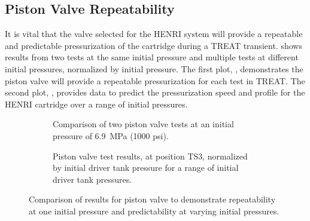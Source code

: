 \subsection{Piston Valve Repeatability} \label{ss:repeatability}
It is vital that the valve selected for the HENRI system will provide a repeatable and predictable pressurization of the cartridge during a TREAT transient.  shows results from two tests at the same initial pressure and multiple tests at different initial pressures, normalized by initial pressure. The first plot, , demonstrates the piston valve will provide a repeatable pressurization for each test in TREAT. The second plot, , provides data to predict the pressurization speed and profile for the HENRI cartridge over a range of initial pressures.


\begin{figure}[htbp]
    \centering
    \begin{subfigure}[t]{0.45\textwidth}
        \centering
        \caption{Comparison of two piston valve tests at an initial pressure of \SI{6.9}{\mega\pascal} (1000 psi).}
        \label{fig:piston 2 test}
    \end{subfigure}
    \hfill
    \begin{subfigure}[t]{0.45\textwidth}
        \centering
        \caption{Piston valve test results, at position TS3, normalized by initial driver tank pressure for a range of initial driver tank pressures.}
        \label{fig:norm}
    \end{subfigure}
    \caption{Comparison of results for piston valve to demonstrate repeatability at one initial pressure and predictability at varying initial pressures.}
    \label{fig:piston repeatability}
\end{figure}


